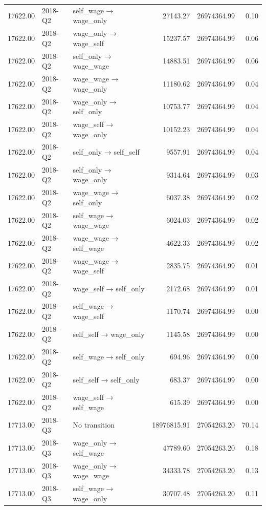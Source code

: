 \begin{table}[ht]
{\begin{tabular}{rllrrr}
  17622.00 & 2018-Q2 & self\_wage → wage\_only & 27143.27 & 26974364.99 & 0.10 \\ 
  17622.00 & 2018-Q2 & wage\_only → wage\_self & 15237.57 & 26974364.99 & 0.06 \\ 
  17622.00 & 2018-Q2 & self\_only → wage\_wage & 14883.51 & 26974364.99 & 0.06 \\ 
  17622.00 & 2018-Q2 & wage\_wage → wage\_only & 11180.62 & 26974364.99 & 0.04 \\ 
  17622.00 & 2018-Q2 & wage\_only → self\_only & 10753.77 & 26974364.99 & 0.04 \\ 
  17622.00 & 2018-Q2 & wage\_self → wage\_only & 10152.23 & 26974364.99 & 0.04 \\ 
  17622.00 & 2018-Q2 & self\_only → self\_self & 9557.91 & 26974364.99 & 0.04 \\ 
  17622.00 & 2018-Q2 & self\_only → wage\_only & 9314.64 & 26974364.99 & 0.03 \\ 
  17622.00 & 2018-Q2 & wage\_wage → self\_only & 6037.38 & 26974364.99 & 0.02 \\ 
  17622.00 & 2018-Q2 & self\_wage → wage\_wage & 6024.03 & 26974364.99 & 0.02 \\ 
  17622.00 & 2018-Q2 & wage\_wage → self\_wage & 4622.33 & 26974364.99 & 0.02 \\ 
  17622.00 & 2018-Q2 & wage\_wage → wage\_self & 2835.75 & 26974364.99 & 0.01 \\ 
  17622.00 & 2018-Q2 & wage\_self → self\_only & 2172.68 & 26974364.99 & 0.01 \\ 
  17622.00 & 2018-Q2 & self\_wage → wage\_self & 1170.74 & 26974364.99 & 0.00 \\ 
  17622.00 & 2018-Q2 & self\_self → wage\_only & 1145.58 & 26974364.99 & 0.00 \\ 
  17622.00 & 2018-Q2 & self\_wage → self\_only & 694.96 & 26974364.99 & 0.00 \\ 
  17622.00 & 2018-Q2 & self\_self → self\_only & 683.37 & 26974364.99 & 0.00 \\ 
  17622.00 & 2018-Q2 & wage\_self → self\_wage & 615.39 & 26974364.99 & 0.00 \\ 
  17713.00 & 2018-Q3 & No transition & 18976815.91 & 27054263.20 & 70.14 \\ 
  17713.00 & 2018-Q3 & wage\_only → self\_wage & 47789.60 & 27054263.20 & 0.18 \\ 
  17713.00 & 2018-Q3 & wage\_only → wage\_wage & 34333.78 & 27054263.20 & 0.13 \\ 
  17713.00 & 2018-Q3 & self\_wage → wage\_only & 30707.48 & 27054263.20 & 0.11 \\ 

\end{tabular}}
\end{table}
